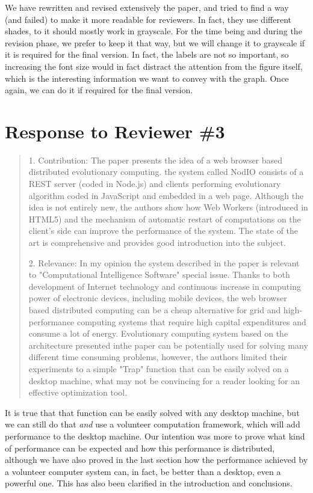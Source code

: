 \documentclass[preprint]{elsarticle}
\begin{document}
We have rewritten and revised extensively the paper, and tried to find
a way (and failed) to make it more readable for reviewers. In fact,
they use different shades, to it should mostly work in grayscale. For the time being and
during the revision phase, we prefer to keep it that way, but we will
change it to grayscale if it is required for the final version. 
In fact, the labels are not so important, so increasing the font size
would in fact distract the attention from the figure itself, which is
the interesting information we want to convey with the graph. Once
again, we can do it if required for the final version.

\section{Response to Reviewer \#3}

\begin{quote}
1. Contribution: The paper presents the idea of a web browser based distributed evolutionary computing.
the system called NodIO consists of a REST server (coded in Node.js) and clients performing
evolutionary algorithm coded in JavaScript and embedded in a web page. Although the idea is not
entirely new, the authors show how Web Workers (introduced in HTML5) and the mechanism of
automatic restart of computations on the client's side can improve the performance of the system. The
state of the art is comprehensive and provides good introduction into the subject.

2. Relevance: In my opinion the system described in the paper is relevant to "Computational Intelligence
Software" special issue. Thanks to both development of Internet technology and continuous increase in
computing power of electronic devices, including mobile devices, the web browser based distributed
computing can be a cheap alternative for grid and high-performance computing systems that require
high capital expenditures and consume a lot of energy. Evolutionary computing system based on the
architecture presented inthe paper can be potentially used for solving many different time consuming
problems, however, the authors limited their experiments to a simple "Trap" function that can be easily
solved on a desktop machine, what may not be convincing for a reader looking for an effective
optimization tool.
\end{quote}

It is true that that function can be easily solved with any desktop
machine, but we can still do that {\em and} use a volunteer
computation framework, which will add performance to the desktop
machine. Our intention was more to prove what kind of performance can
be expected and how this performance is distributed, although we have
also proved in the last section how the performance achieved by a
volunteer computer system can, in fact, be better than a desktop, even
a powerful one. This has also been clarified in the introduction and
conclusions. 
\end{document}
